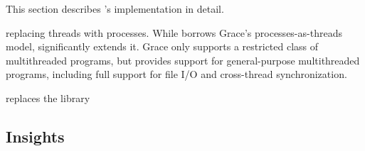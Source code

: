 \begin{comment}
To detect whether there are potential conflicts that would preclude
copying, \sheriff{} associates a version number with each page in shared
mapping.  \sheriff{} increments each page's version number after every
commit of that page. Before the creation of each twin page, \sheriff{}
saves the corresponding page version number for one page.  In the end
of transaction, if the saved page version number is still the same as
the shared page version number, that means that no one else has
committed a new version to corresponding shared mapping, so it is safe
to copy the entire working page as next version of shared mapping.
\end{itemize}
\end{comment}


\begin{comment}
\begin{figure}[!t]
\small 
\begin{lstlisting}[frame=trbl]{}
//@This function is called by pthread_join
void uniqueChecking (void) {
  // Is this the initial thread?
  if(getpid() == initialPid) {
    // Use waitpid to check for uniqueness.
    if(waitpid(-1, NULL, WNOHANG) == -1 
	   && errno == ECHILD) {
	// Close protection here.
        closeMemoryProtection();
        _protected = false;
    }
  }
}
\end{lstlisting}
\caption{Pseudo-code for uniqueness checking; when there is only one thread running, there is no need to protect any pages.\label{fig:unique}}
\end{figure}

\end{comment}

\label{sec:overview}


This section describes \sheriff{}'s implementation in detail.

 replacing threads with
processes. While \sheriff{} borrows Grace's processes-as-threads model, \sheriff{} significantly extends it. Grace
only supports a restricted class of multithreaded programs, but \sheriff{}
provides support for general-purpose multithreaded programs, including
full support for file I/O and cross-thread synchronization.

\sheriff{} replaces the \pthreads{} library 



\subsection{Insights}
\label{overview:insight}

